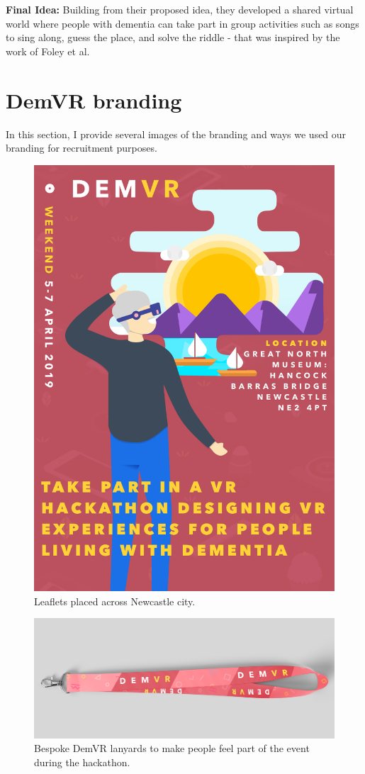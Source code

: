 \textbf{Final Idea:} Building from their proposed idea, they developed a shared virtual world where people with dementia can take part in group activities such as songs to sing along, guess the place, and solve the riddle - that was inspired by the work of Foley et al. \citep{foley_printer_2019}


\newpage
\section{DemVR branding}
\label{app:Branding}
In this section, I provide several images of the branding and ways we used our branding for recruitment purposes.


\begin{figure}[htp]
    \centering
    \includegraphics[width=0.8\linewidth]{Images/Appendix/DemVR appendix/DemVR Flyer.png}
    \caption{Leaflets placed across Newcastle city.}
    \label{fig:App:Leaflets}
\end{figure}

\begin{figure}[htp]
    \centering
    \includegraphics[width=0.8\linewidth]{Images/Appendix/DemVR appendix/Lanyard.png}
    \caption{Bespoke DemVR lanyards to make people feel part of the event during the hackathon.}
    \label{fig:App:Lanyard}
\end{figure}

